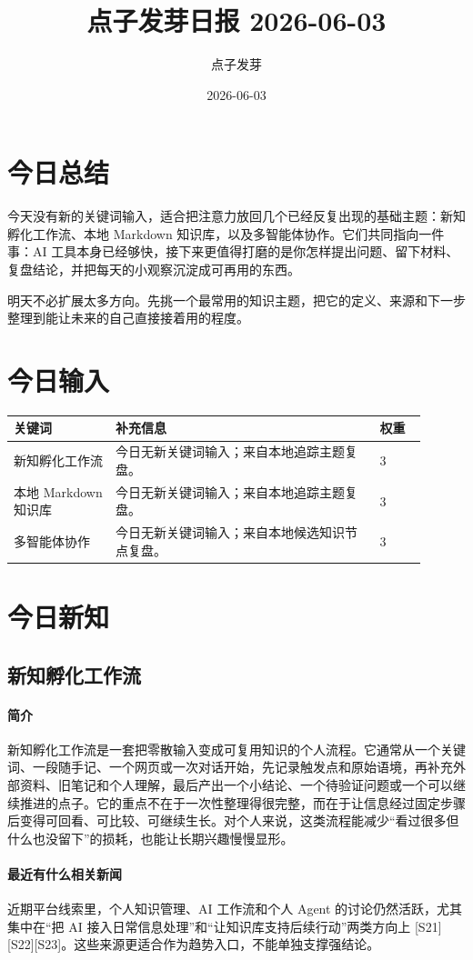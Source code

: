 \documentclass[UTF8,zihao=-4]{ctexart}
\title{\bfseries 点子发芽日报 2026-06-03}
\author{点子发芽}
\date{2026-06-03}
\begin{document}
\maketitle
\section*{今日总结}
今天没有新的关键词输入，适合把注意力放回几个已经反复出现的基础主题：新知孵化工作流、本地 Markdown 知识库，以及多智能体协作。它们共同指向一件事：AI 工具本身已经够快，接下来更值得打磨的是你怎样提出问题、留下材料、复盘结论，并把每天的小观察沉淀成可再用的东西。

明天不必扩展太多方向。先挑一个最常用的知识主题，把它的定义、来源和下一步整理到能让未来的自己直接接着用的程度。
\section*{今日输入}
\begin{longtable}{|p{0.22\linewidth}|p{0.58\linewidth}|p{0.10\linewidth}|}
\hline
\textbf{关键词} & \textbf{补充信息} & \textbf{权重} \\
\hline
新知孵化工作流 & 今日无新关键词输入；来自本地追踪主题复盘。 & 3 \\
\hline
本地 Markdown 知识库 & 今日无新关键词输入；来自本地追踪主题复盘。 & 3 \\
\hline
多智能体协作 & 今日无新关键词输入；来自本地候选知识节点复盘。 & 3 \\
\hline
\end{longtable}
\section*{今日新知}
\subsection*{新知孵化工作流}
\paragraph{简介} 新知孵化工作流是一套把零散输入变成可复用知识的个人流程。它通常从一个关键词、一段随手记、一个网页或一次对话开始，先记录触发点和原始语境，再补充外部资料、旧笔记和个人理解，最后产出一个小结论、一个待验证问题或一个可以继续推进的点子。它的重点不在于一次性整理得很完整，而在于让信息经过固定步骤后变得可回看、可比较、可继续生长。对个人来说，这类流程能减少“看过很多但什么也没留下”的损耗，也能让长期兴趣慢慢显形。
\paragraph{最近有什么相关新闻} 近期平台线索里，个人知识管理、AI 工作流和个人 Agent 的讨论仍然活跃，尤其集中在“把 AI 接入日常信息处理”和“让知识库支持后续行动”两类方向上 [S21][S22][S23]。这些来源更适合作为趋势入口，不能单独支撑强结论。
\end{document}
